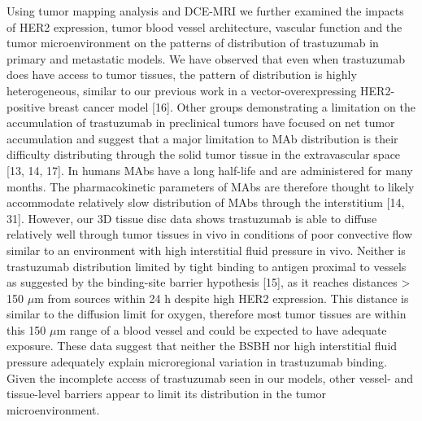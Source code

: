 Using tumor mapping analysis and DCE-MRI we further examined the impacts of HER2 expression, tumor blood vessel architecture, vascular function and the tumor microenvironment on the patterns of distribution of trastuzumab in primary and metastatic models.
We have observed that even when trastuzumab does have access to tumor tissues, the pattern of distribution is highly heterogeneous, similar to our previous work in a vector-overexpressing HER2-positive breast cancer model [16].
Other groups demonstrating a limitation on the accumulation of trastuzumab in preclinical tumors have focused on net tumor accumulation and suggest that a major limitation to MAb distribution is their difficulty distributing through the solid tumor tissue in the extravascular space [13, 14, 17].
In humans MAbs have a long half-life and are administered for many months.
The pharmacokinetic parameters of MAbs are therefore thought to likely accommodate relatively slow distribution of MAbs through the interstitium [14, 31].
However, our 3D tissue disc data shows trastuzumab is able to diffuse relatively well through tumor tissues in vivo in conditions of poor convective flow similar to an environment with high interstitial fluid pressure in vivo.
Neither is trastuzumab distribution limited by tight binding to antigen proximal to vessels as suggested by the binding-site barrier hypothesis [15], as it reaches distances > 150 $\mu$m from sources within 24 h despite high HER2 expression.
This distance is similar to the diffusion limit for oxygen, therefore most tumor tissues are within this 150 $\mu$m range of a blood vessel and could be expected to have adequate exposure.
These data suggest that neither the BSBH nor high interstitial fluid pressure adequately explain microregional variation in trastuzumab binding.
Given the incomplete access of trastuzumab seen in our models, other vessel- and tissue-level barriers appear to limit its distribution in the tumor microenvironment.

